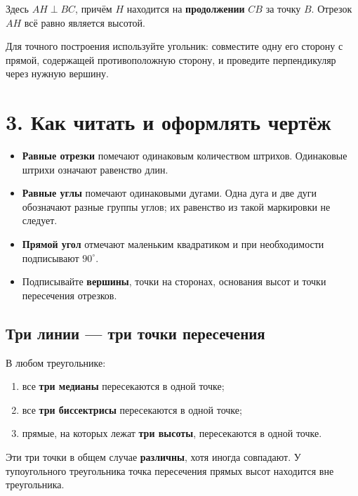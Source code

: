 \documentclass[a4paper,12pt]{article}
\newcommand{\sectionline}{\par\vspace{-3mm}{\color{accent}\hrule height .5pt}\vspace{4mm}}
\newcommand{\key}[1]{\textcolor{darkaccent}{\textbf{#1}}}
\newcommand{\mathnote}[1]{{\small\color{softgray}#1}}
\begin{document}
\begin{center}
\end{center}
Здесь $AH\perp BC$, причём $H$ находится на \textbf{продолжении} $CB$ за точку $B$. Отрезок $AH$ всё равно является высотой.

\mathnote{Для точного построения используйте угольник: совместите одну его сторону с прямой, содержащей противоположную сторону, и проведите перпендикуляр через нужную вершину.}

\clearpage
\section*{3. Как читать и оформлять чертёж}
\sectionline
\begin{itemize}[leftmargin=*,itemsep=5pt]
\item \key{Равные отрезки} помечают одинаковым количеством штрихов. Одинаковые штрихи означают равенство длин.
\item \key{Равные углы} помечают одинаковыми дугами. Одна дуга и две дуги обозначают разные группы углов; их равенство из такой маркировки не следует.
\item \key{Прямой угол} отмечают маленьким квадратиком и при необходимости подписывают $90^\circ$.
\item Подписывайте \key{вершины}, точки на сторонах, основания высот и точки пересечения отрезков.
\end{itemize}

\subsection*{Три линии --- три точки пересечения}
В любом треугольнике:
\begin{enumerate}[label=\arabic*.,itemsep=3pt]
\item все \textbf{три медианы} пересекаются в одной точке;
\item все \textbf{три биссектрисы} пересекаются в одной точке;
\item прямые, на которых лежат \textbf{три высоты}, пересекаются в одной точке.
\end{enumerate}
Эти три точки в общем случае \textbf{различны}, хотя иногда совпадают. У тупоугольного треугольника точка пересечения прямых высот находится вне треугольника.
\end{document}
